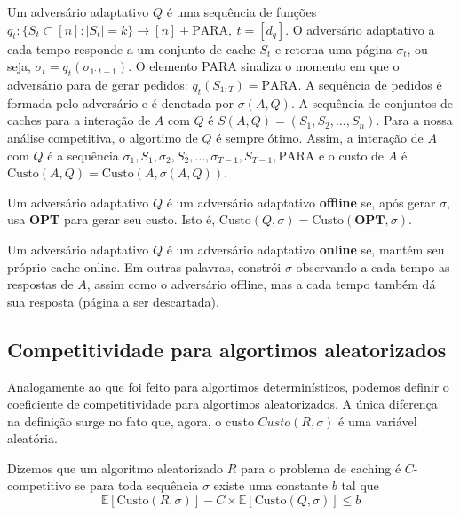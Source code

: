 Um adversário adaptativo \(Q\) é uma sequência de funções \(q_t : \{S_t \subset [n] : |S_t| = k\} \to [n] + {\text{PARA}}, \ t = [d_q]\). O adversário adaptativo a cada tempo responde a um conjunto de cache $S_t$ e retorna uma página \(\sigma_t\), ou seja, \(\sigma_t = q_t(\sigma_{1:t-1})\). O elemento PARA sinaliza o momento em que o adversário para de gerar pedidos: \(q_t(S_{1:T}) = \text{PARA}\). A sequência de pedidos é formada pelo adversário e é denotada por \(\sigma(A,Q)\). A sequência de conjuntos de caches para a interação de \(A\) com \(Q\) é \(S(A,Q) = (S_1, S_2, \dots, S_n)\). Para a nossa análise competitiva, o algortimo de \(Q\) é sempre ótimo. Assim, a interação de \(A\) com \(Q\) é a sequência \(\sigma_1, S_1, \sigma_2, S_2, \dots, \sigma_{T-1}, S_{T-1}, \text{PARA}\) e o custo de \(A\) é \(\text{Custo}(A, Q) = \text{Custo}(A, \sigma(A, Q))\).

\begin{definition}
  Um adversário adaptativo \(Q\) é um adversário adaptativo \textbf{offline} se, após gerar \(\sigma\), usa \textbf{OPT} para gerar seu custo. Isto é, Custo\((Q, \sigma) = \text{Custo}(\textbf{OPT}, \sigma)\).
\end{definition}

\begin{definition}
  Um adversário adaptativo \(Q\) é um adversário adaptativo \textbf{online} se, mantém seu próprio cache online. Em outras palavras, constrói \(\sigma\) observando a cada tempo as respostas de \(A\), assim como o adversário offline, mas a cada tempo também dá sua resposta (página a ser descartada). 
\end{definition}

\subsection{Competitividade para algortimos aleatorizados}

Analogamente ao que foi feito para algortimos determinísticos, podemos definir o coeficiente de competitividade para algortimos aleatorizados. A única diferença na definição surge no fato que, agora, o custo \(Custo(R, \sigma)\) é uma variável aleatória.

\begin{definition}
  Dizemos que um algoritmo aleatorizado \(R\) para o problema de caching é \(C\)-competitivo se para toda sequência \(\sigma\) existe uma constante \(b\) tal que
  \begin{equation}
    \mathbb{E}[\text{Custo}(R, \sigma)] - C \times \mathbb{E}[\text{Custo}(Q, \sigma)] \leqslant b
  \end{equation}
  
\end{definition}

